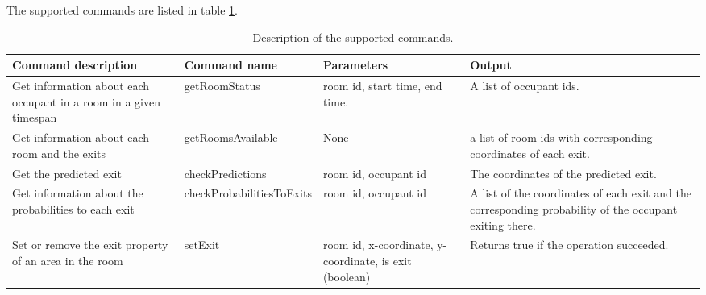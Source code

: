 The supported commands are listed in table \ref{tab:command}.
\begin{center}
\begin{table}
    \begin{tabular}{ | p{4.5cm} | p{4.7cm} | p{3cm} | p{3.5cm} |} \hline
    Command description & Command name & Parameters & Output \\ \hline
    Get information about each occupant in a room in a given timespan & getRoomStatus & room id, start time, end time. & A list of occupant ids. \\ \hline
    Get information about each room and the exits & getRoomsAvailable & None & a list of room ids with corresponding coordinates of each exit. \\ \hline
	Get the predicted exit & checkPredictions & room id, occupant id & The coordinates of the predicted exit. \\ \hline
	Get information about the probabilities to each exit & checkProbabilitiesToExits & room id, occupant id & A list of the coordinates of each exit and the corresponding probability of the occupant exiting there. \\ \hline
    Set  or remove the exit property of an area in the room & setExit & room id, x-coordinate, y-coordinate, is exit (boolean) & Returns true if the operation succeeded. \\ 
	\hline \end{tabular}
	\caption{Description of the supported commands.}
	\label{tab:command}
\end{table}
\end{center}